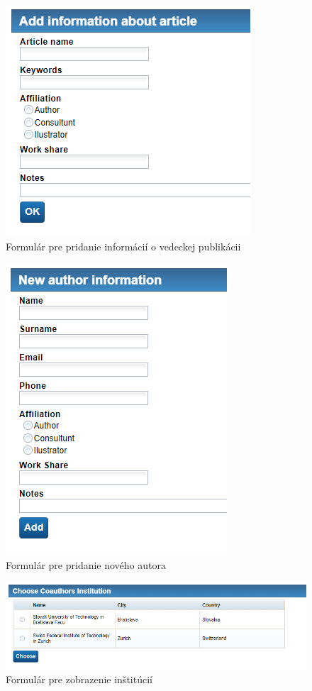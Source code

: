 \documentclass[10pt,oneside,slovak,a4paper]{article}
\begin{document}
\begin{figure} [H]
\centering
\includegraphics[scale=0.4]{forms/Coach for adding information about article.png} 
\caption{Formulár pre pridanie informácií o vedeckej publikácii}
\end{figure}

\begin{figure} [H]
\centering
\includegraphics[scale=0.4]{forms/Coach for adding new author.png} 
\caption{Formulár pre pridanie nového autora}
\end{figure}

\begin{figure} [H]
\centering
\includegraphics[scale=0.4]{forms/Coach for Display Institutions.png} 
\caption{Formulár pre zobrazenie inštitúcií}
\end{figure}
\end{document}
